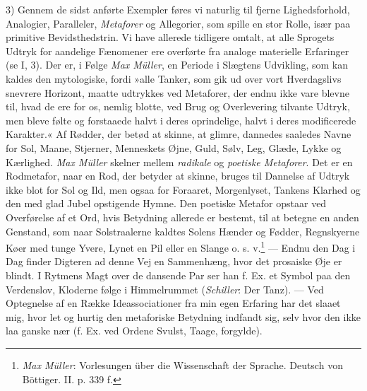 \documentclass[12pt,a4paper,openany]{book}
\newcommand{\opage}[1]{\marginnote{\footnotesize\textit{[#1]}}}
\begin{document}
3) Gennem de sidst anførte Exempler føres vi naturlig til fjerne
Lighedsforhold, Analogier, Paralleler, \emph{Metaforer} og Allegorier,
som spille en stor Rolle, især paa primitive Bevidsthedstrin. Vi have
allerede tidligere omtalt, at alle Sprogets Udtryk for aandelige
Fænomener ere overførte fra analoge materielle Erfaringer (se I, 3). Der
er, i Følge \emph{Max Müller}, en Periode i Slægtens Udvikling, som kan
kaldes den mytologiske, fordi »alle Tanker, som gik ud over vort
Hverdagslivs snevrere Horizont, maatte udtrykkes ved Metaforer, der
endnu ikke vare blevne til, hvad de ere for os, nemlig blotte, ved Brug
og Overlevering tilvante Udtryk, men bleve følte og forstaaede halvt i
deres oprindelige, halvt i deres modificerede Karakter.« Af Rødder, der
betød at skinne, at glimre, dannedes saaledes Navne for Sol, Maane,
Stjerner, Menneskets Øjne, Guld, Sølv, Leg, Glæde, Lykke og Kærlighed.
\emph{Max Müller} skelner mellem \emph{radikale} og \emph{poetiske
Metaforer}. Det er en Rodmetafor, naar en Rod, der betyder at skinne,
bruges til Dannelse af Udtryk ikke blot for Sol og Ild, men ogsaa for
Foraaret, Morgenlyset, Tankens Klarhed og den med glad Jubel opstigende
Hymne. Den poetiske Metafor opstaar ved Overførelse af et Ord, hvis
Betydning allerede er bestemt, til at betegne en anden Genstand, som
naar Solstraalerne kaldtes Solens Hænder og Fødder, Regnskyerne Køer med
tunge Yvere, Lynet en Pil eller en Slange o. s. v.\footnote[1]{\emph{Max
Müller}: Vorlesungen über die Wissenschaft der Sprache. Deutsch von
Böttiger. II. p. 339 f.} --- Endnu den Dag i Dag finder Digteren ad
denne Vej en Sammenhæng, hvor det prosaiske Øje er blindt. I Rytmens
Magt over de dansende Par ser han f. Ex. et Symbol paa den Verdenslov,
Kloderne følge i Himmelrummet (\emph{Schiller}: Der Tanz). --- Ved
Optegnelse af en Række Ideassociationer fra min egen
\opage{189}Erfaring har det slaaet mig, hvor let og hurtig den
metaforiske Betydning indfandt sig, selv hvor den ikke laa ganske nær
(f. Ex. ved Ordene Svulst, Taage, forgylde).
\end{document}
